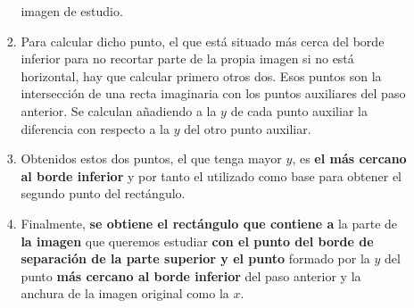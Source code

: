 \begin{enumerate}
\begin{enumerate}[label*=\arabic*.]
\begin{enumerate}[label*=\arabic*.]
      imagen de estudio.
    \item Para calcular dicho punto, el que está situado más cerca del
      borde inferior para no recortar parte de la propia imagen si no
      está horizontal, hay que calcular primero otros dos. Esos puntos
      son la intersección de una recta imaginaria con los puntos
      auxiliares del paso anterior. Se calculan añadiendo a la $y$ de
      cada punto auxiliar la diferencia con respecto a la $y$ del otro
      punto auxiliar.
    \item Obtenidos estos dos puntos, el que tenga mayor $y$, es
      \textbf{el más cercano al borde inferior} y por tanto el
      utilizado como base para obtener el segundo punto del
      rectángulo.
    \item Finalmente, \textbf{se obtiene el rectángulo que contiene a}
      la parte de \textbf{la imagen} que queremos estudiar \textbf{con
        el punto del borde de separación de la parte superior y el
        punto} formado por la $y$ del punto \textbf{más cercano al
        borde inferior} del paso anterior y la anchura de la imagen
      original como la $x$.
    \end{enumerate}
  \end{enumerate}

\end{enumerate}